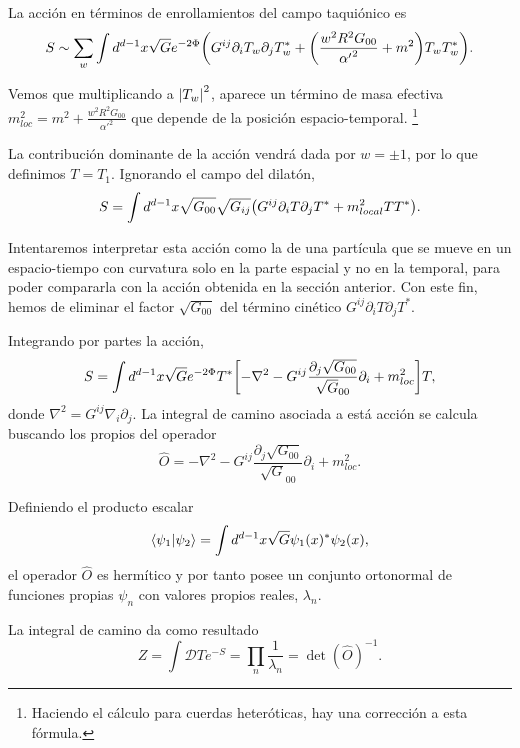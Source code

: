 La acción en términos de enrollamientos del campo taquiónico es
\begin{equation}
  S \sim\sum_w  \int d^{d-1} x \sqrt G e^{-2\Phi}\qty(G^{ij}\partial_i T_w \partial_j T_{w}^* + \qty(\frac{w^2 R^2 G_{00}}{{\alpha'}^2} + m^2) T_w T_{w}^*) .
\end{equation}

Vemos que multiplicando a $\abs{T_w}^2$, aparece un término de masa efectiva $m^2_{loc} = m^2 +\frac{w^2 R^2 G_{00}}{{\alpha'}^2}$
que depende de la posición espacio-temporal.
\footnote{Haciendo el cálculo para cuerdas heteróticas, hay una corrección a esta fórmula.}

La contribución dominante de la acción vendrá dada por $w=\pm 1$, por lo que definimos $T=T_1$.
Ignorando el campo del dilatón,
\begin{equation}
  S  =  \int d^{d-1} x \sqrt{G_{00}}\sqrt{G_{ij}} \qty(G^{ij}\partial_i T \partial_j T^* +m^2_{local} TT^*) .
\end{equation}

Intentaremos interpretar esta acción como la de una partícula que se mueve en un espacio-tiempo con 
curvatura solo en la parte espacial y no en la temporal, para poder compararla con la acción obtenida
en la sección anterior.
Con este fin, hemos de eliminar el factor $\sqrt{G_{00}}$ del término cinético $G^{ij}\partial_i T \partial_j T^*$.

Integrando por partes la acción,
\begin{equation}
  S = \int d^{d-1} x \sqrt G e^{-2\Phi} T^* \qty[-\nabla^2-G^{ij}\frac{\partial_j \sqrt{G_{00}}}{\sqrt G_{00}}\partial_i + m^2_{loc}]T,
\end{equation}
donde $\nabla^2 = G^{ij}\nabla_i \partial_j$.
La integral de camino asociada a está acción se calcula buscando los
propios del operador 
\begin{equation}
  \widehat{O} =-\nabla^2-G^{ij}\frac{\partial_j \sqrt{G_{00}}}{\sqrt G_{00}}\partial_i + m^2_{loc}.
\end{equation}

Definiendo el producto escalar
\begin{equation}
  \braket{\psi_1}{\psi_2} = \int d^{d-1} x \sqrt G \psi_1(x)^* \psi_2(x),
\end{equation}
el operador $\widehat O$ es hermítico y por tanto posee un conjunto ortonormal de funciones
propias $\psi_n$ con valores propios reales, $\lambda_n$.

La integral de camino da como resultado
\begin{equation}
  Z=\int \mathcal D T e^{-S} =\prod_n \frac{1}{\lambda_n} = \det(\widehat O)^{-1}.
\end{equation}

